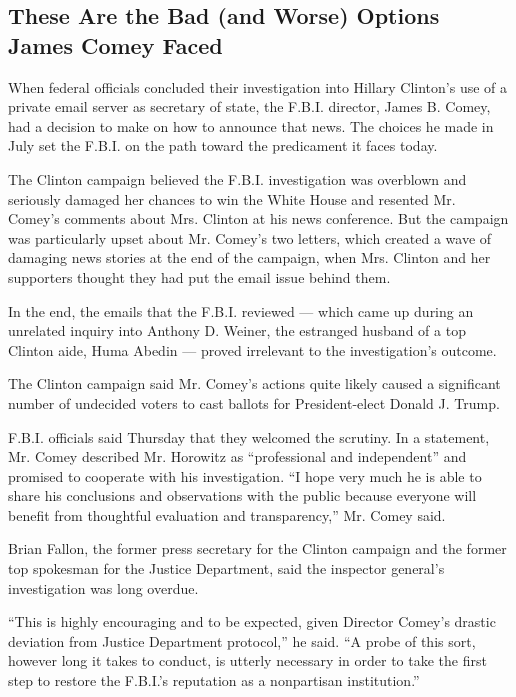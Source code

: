 \hypertarget{these-are-the-bad-and-worse-options-james-comey-faced}{%
\subsection{These Are the Bad (and Worse) Options James Comey
Faced}\label{these-are-the-bad-and-worse-options-james-comey-faced}}

When federal officials concluded their investigation into Hillary
Clinton's use of a private email server as secretary of state, the
F.B.I. director, James B. Comey, had a decision to make on how to
announce that news. The choices he made in July set the F.B.I. on the
path toward the predicament it faces today.

The Clinton campaign believed the F.B.I. investigation was overblown and
seriously damaged her chances to win the White House and resented Mr.
Comey's comments about Mrs. Clinton at his news conference. But the
campaign was particularly upset about Mr. Comey's two letters, which
created a wave of damaging news stories at the end of the campaign, when
Mrs. Clinton and her supporters thought they had put the email issue
behind them.

In the end, the emails that the F.B.I. reviewed --- which came up during
an unrelated inquiry into Anthony D. Weiner, the estranged husband of a
top Clinton aide, Huma Abedin --- proved irrelevant to the
investigation's outcome.

The Clinton campaign said Mr. Comey's actions quite likely caused a
significant number of undecided voters to cast ballots for
President-elect Donald J. Trump.

F.B.I. officials said Thursday that they welcomed the scrutiny. In a
statement, Mr. Comey described Mr. Horowitz as ``professional and
independent'' and promised to cooperate with his investigation. ``I hope
very much he is able to share his conclusions and observations with the
public because everyone will benefit from thoughtful evaluation and
transparency,'' Mr. Comey said.

Brian Fallon, the former press secretary for the Clinton campaign and
the former top spokesman for the Justice Department, said the inspector
general's investigation was long overdue.

``This is highly encouraging and to be expected, given Director Comey's
drastic deviation from Justice Department protocol,'' he said. ``A probe
of this sort, however long it takes to conduct, is utterly necessary in
order to take the first step to restore the F.B.I.'s reputation as a
nonpartisan institution.''

